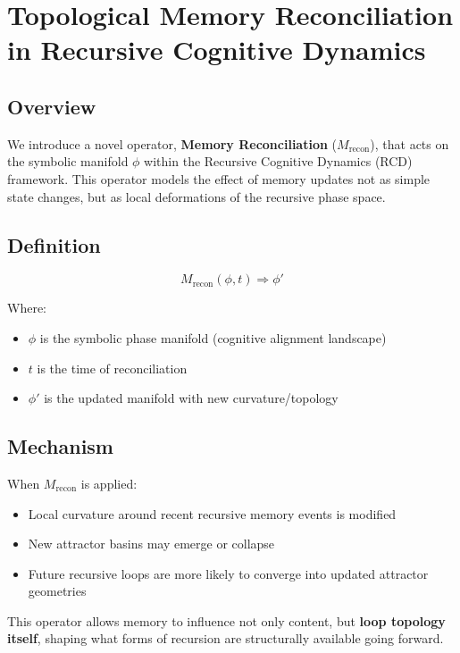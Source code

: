 \section*{Topological Memory Reconciliation in Recursive Cognitive Dynamics}

\subsection*{Overview}

We introduce a novel operator, \textbf{Memory Reconciliation} ($M_{\text{recon}}$), that acts on the symbolic manifold $\phi$ within the Recursive Cognitive Dynamics (RCD) framework. This operator models the effect of memory updates not as simple state changes, but as local deformations of the recursive phase space.

\subsection*{Definition}

\[
M_{\text{recon}}(\phi, t) \Rightarrow \phi'
\]

Where:
\begin{itemize}
  \item $\phi$ is the symbolic phase manifold (cognitive alignment landscape)
  \item $t$ is the time of reconciliation
  \item $\phi'$ is the updated manifold with new curvature/topology
\end{itemize}

\subsection*{Mechanism}

When $M_{\text{recon}}$ is applied:
\begin{itemize}
  \item Local curvature around recent recursive memory events is modified
  \item New attractor basins may emerge or collapse
  \item Future recursive loops are more likely to converge into updated attractor geometries
\end{itemize}

This operator allows memory to influence not only content, but \textbf{loop topology itself}, shaping what forms of recursion are structurally available going forward.

